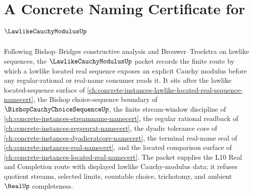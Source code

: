 \chapter{A Concrete Naming Certificate for $\LawlikeCauchyModulusUp$}
\label{ch:concrete-instances-lawlike-cauchy-modulus-namecert}

Following Bishop--Bridges constructive analysis and Brouwer--Troelstra on lawlike sequences, the $\LawlikeCauchyModulusUp$ packet records the finite route by which a lawlike located real sequence exposes an explicit Cauchy modulus before any regular-rational or real-name consumer reads it. It sits after the lawlike located-sequence surface of \autoref{ch:concrete-instances-lawlike-located-real-sequence-namecert}, the Bishop choice-sequence boundary of $\BishopCauchyChoiceSequenceUp$, the finite stream-window discipline of \autoref{ch:concrete-instances-streamname-namecert}, the regular rational readback of \autoref{ch:concrete-instances-regseqrat-namecert}, the dyadic tolerance core of \autoref{ch:concrete-instances-dyadicratcore-namecert}, the terminal real-name seal of \autoref{ch:concrete-instances-real-namecert}, and the located comparison surface of \autoref{ch:concrete-instances-located-real-namecert}. The packet supplies the L10 Real and Completion route with displayed lawlike Cauchy-modulus data; it refuses quotient streams, selected limits, countable choice, trichotomy, and ambient $\RealUp$ completeness.

